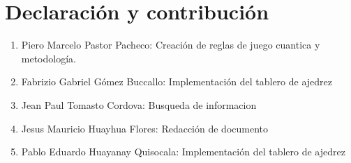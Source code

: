 \section{Declaración y contribución}
\begin{enumerate}
\item Piero Marcelo Pastor Pacheco: Creación de reglas de juego cuantica y metodología.
\item Fabrizio Gabriel Gómez  Buccallo: Implementación del tablero de ajedrez
\item Jean Paul Tomasto Cordova: Busqueda de informacion
\item Jesus Mauricio Huayhua Flores: Redacción de documento
\item Pablo Eduardo Huayanay Quisocala: Implementación del tablero de ajedrez
\end{enumerate}